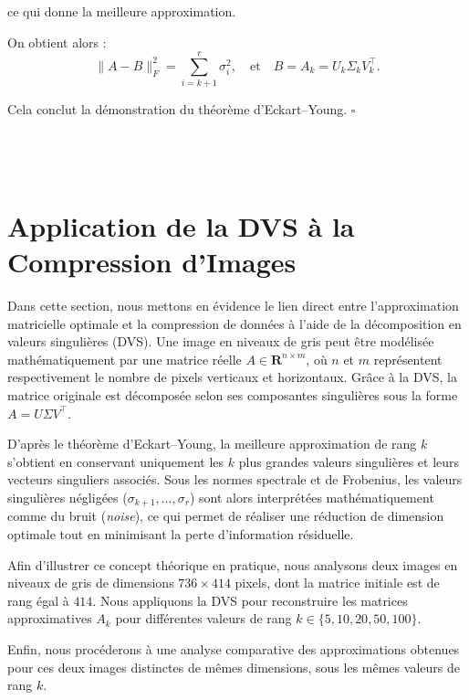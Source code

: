 \documentclass[12pt]{report}
\begin{document}
\noindent ce qui donne la meilleure approximation.

\noindent On obtient alors :
\begin{equation}
    \|A - B\|_F^2 = \sum_{i=k+1}^{r} \sigma_i^2, \quad \text{et} \quad B = A_k = U_k \Sigma_k V_k^{\top}.
\end{equation}

\noindent Cela conclut la démonstration du théorème d'Eckart–Young.
\hfill $\square$
\\
\\
\\
\\
\section*{Application de la DVS à la Compression d'Images}
Dans cette section, nous mettons en évidence le lien direct entre l'approximation matricielle optimale et la compression de données à l'aide de la décomposition en valeurs singulières (DVS). Une image en niveaux de gris peut être modélisée mathématiquement par une matrice réelle $A \in \mathbf{R}^{n \times m}$, où $n$ et $m$ représentent respectivement le nombre de pixels verticaux et horizontaux. Grâce à la DVS, la matrice originale est décomposée selon ses composantes singulières sous la forme $A = U \Sigma V^{\top}$.

D'après le théorème d'Eckart–Young, la meilleure approximation de rang $k$ s'obtient en conservant uniquement les $k$ plus grandes valeurs singulières et leurs vecteurs singuliers associés. Sous les normes spectrale et de Frobenius, les valeurs singulières négligées ($\sigma_{k+1}, \dots, \sigma_r$) sont alors interprétées mathématiquement comme du bruit (\textit{noise}), ce qui permet de réaliser une réduction de dimension optimale tout en minimisant la perte d'information résiduelle.

Afin d'illustrer ce concept théorique en pratique, nous analysons deux images en niveaux de gris de dimensions $736 \times 414$ pixels, dont la matrice initiale est de rang égal à $414$. Nous appliquons la DVS pour reconstruire les matrices approximatives $A_k$ pour différentes valeurs de rang $k \in \{5, 10, 20, 50, 100\}$.

Enfin, nous procéderons à une analyse comparative des approximations obtenues pour ces deux images distinctes de mêmes dimensions, sous les mêmes valeurs de rang $k$.
\end{document}
